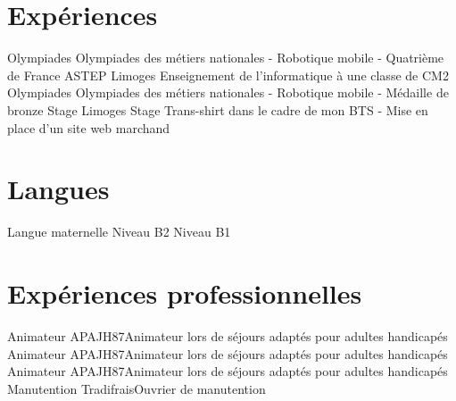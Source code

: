 \documentclass[letterpaper]{twentysecondcv} %
\begin{document}
%	 

\section{Expériences}

\begin{twenty} %
	  {Olympiades}            {}          {Olympiades des métiers nationales - Robotique mobile - Quatrième de France}
	       {ASTEP}                 {Limoges}   {Enseignement de l'informatique à une classe de CM2}
	  {Olympiades}            {}          {Olympiades des métiers nationales - Robotique mobile - Médaille de bronze }
	       {Stage}                 {Limoges}   {Stage Trans-shirt dans le cadre de mon BTS - Mise en place d'un site web marchand }
\end{twenty}


\section{Langues}

\begin{twentyshort} %
	  {Langue maternelle}
	   {Niveau B2}
	  {Niveau B1}
\end{twentyshort}


\section{Expériences professionnelles}

\begin{twenty} %
	 {Animateur}     {APAJH87}{Animateur lors de séjours adaptés pour adultes handicapés}
	   {Animateur}     {APAJH87}{Animateur lors de séjours adaptés pour adultes handicapés}
	   {Animateur}     {APAJH87}{Animateur lors de séjours adaptés pour adultes handicapés}
	   {Manutention}   {Tradifrais}{Ouvrier de manutention}
\end{twenty}
\end{document}
